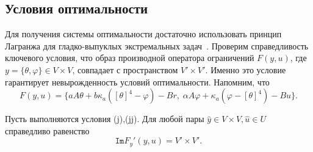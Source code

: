 \subsection{Условия оптимальности}\label{subsec:ch2/sec2/subsec4}


Для получения системы оптимальности достаточно использовать
принцип Лагранжа для гладко-выпуклых экстремальных задач~\cite{11,10}.
Проверим справедливость ключевого условия, что образ производной
оператора ограничений $F(y, u)$, где $y=\{\theta,\varphi\}\in V\times V$,
совпадает с пространством $V'\times V'.$ Именно это условие гарантирует
невырожденность условий оптимальности.
Напомним, что
\[
    F(y, u) = \{ aA\theta + b \kappa_a ( [\theta]^4- \varphi) - Br,\;
    \alpha A \varphi + \kappa_a (\varphi -[\theta]^4) - Bu\}.
\]

\begin{lemma}
    \label{lm:2_2:2}
    Пусть выполняются условия (j),(jj).
    Для любой пары $\hat{y} \in V \times V, \hat{u} \in U$ справедливо равенство
    \[
        \texttt{Im}F_y'(y, u) = V' \times V'.
    \]
\end{lemma}


